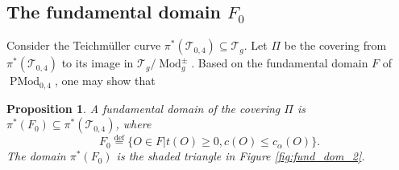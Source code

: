 \documentclass[UTF8]{amsart}
\newtheorem{proposition}[theorem]{Proposition}
\numberwithin{equation}{section}
\theoremstyle{definition}
\theoremstyle{example}
\theoremstyle{remark}
\DeclareMathOperator{\pmodo}{PMod}
\DeclareMathOperator{\modo}{Mod}
\begin{document}
\subsection{The fundamental domain $F_0$}
Consider the Teichm\"uller curve $\pi^{*}(\mathcal{T}_{0,4}) \subseteq \mathcal{T}_g$. Let $\Pi$ be the covering from $\pi^{*}(\mathcal{T}_{0,4})$ to its image in $\mathcal{T}_g/ \modo_g^{\pm}$. 
Based on the fundamental domain $F$ of $\pmodo_{0,4}$, one may show that 
\begin{proposition}
 A fundamental domain of the covering $\Pi$ is $\pi^{*}(F_0) \subseteq \pi^{*}(\mathcal{T}_{0,4})$, where 
\begin{equation}
 F_0  \overset{\mathrm{def}}{=} \{ O\in F | t(O) \ge 0, c(O) \le c_{\alpha}(O)\}. 
\label{for:quad_fund} 
\end{equation}
The domain $\pi^{*}(F_0)$ is the shaded triangle in Figure \ref{fig:fund_dom_2}.
 \label{prop:fundamental_curve}
\end{proposition}
\end{document}
